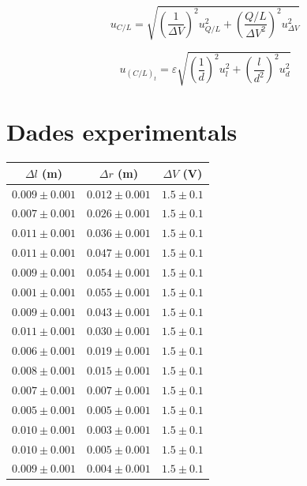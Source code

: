 \documentclass[11pt]{article}
\begin{document}
\begin{equation}
    u_{C/L} = \sqrt{
        \left( \frac{1}{\Delta V} \right)^2 u^2_{Q/L} +
        \left( \frac{Q/L}{\Delta V^2} \right)^2 u^2_{\Delta V}}
    \label{eq: ins_c}
\end{equation}

\begin{equation}
    u_{(C/L)_t} = \varepsilon \sqrt{
    \left( \frac{1}{d} \right)^2 u^2_l +
    \left( \frac{l}{d^2} \right)^2 u^2_d}
    \label{eq: ins_ct}
\end{equation}

\section{Dades experimentals}
\begin{table}[ht]
    \centering
    \begin{tabular}{ccc}
        \hline
        $\Delta l$ (m) & $\Delta r$ (m) & $\Delta V$ (V) \\
        \hline
        $0.009 \pm 0.001$ & $0.012 \pm 0.001$ & $1.5 \pm 0.1$ \\
        $0.007 \pm 0.001$ & $0.026 \pm 0.001$ & $1.5 \pm 0.1$ \\
        $0.011 \pm 0.001$ & $0.036 \pm 0.001$ & $1.5 \pm 0.1$ \\
        $0.011 \pm 0.001$ & $0.047 \pm 0.001$ & $1.5 \pm 0.1$ \\
        $0.009 \pm 0.001$ & $0.054 \pm 0.001$ & $1.5 \pm 0.1$ \\
        $0.001 \pm 0.001$ & $0.055 \pm 0.001$ & $1.5 \pm 0.1$ \\
        $0.009 \pm 0.001$ & $0.043 \pm 0.001$ & $1.5 \pm 0.1$ \\
        $0.011 \pm 0.001$ & $0.030 \pm 0.001$ & $1.5 \pm 0.1$ \\
        $0.006 \pm 0.001$ & $0.019 \pm 0.001$ & $1.5 \pm 0.1$ \\
        $0.008 \pm 0.001$ & $0.015 \pm 0.001$ & $1.5 \pm 0.1$ \\
        $0.007 \pm 0.001$ & $0.007 \pm 0.001$ & $1.5 \pm 0.1$ \\
        $0.005 \pm 0.001$ & $0.005 \pm 0.001$ & $1.5 \pm 0.1$ \\
        $0.010 \pm 0.001$ & $0.003 \pm 0.001$ & $1.5 \pm 0.1$ \\
        $0.010 \pm 0.001$ & $0.005 \pm 0.001$ & $1.5 \pm 0.1$ \\
        $0.009 \pm 0.001$ & $0.004 \pm 0.001$ & $1.5 \pm 0.1$ \\

\end{tabular}
\end{table}
\end{document}
